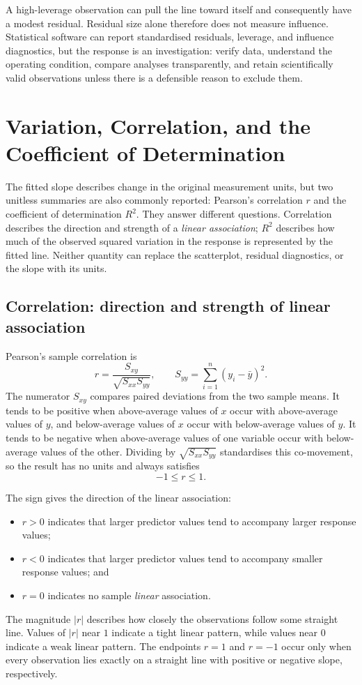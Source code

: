 A high-leverage observation can pull the line toward itself and consequently have a modest residual. Residual size alone therefore does not measure influence. Statistical software can report standardised residuals, leverage, and influence diagnostics, but the response is an investigation: verify data, understand the operating condition, compare analyses transparently, and retain scientifically valid observations unless there is a defensible reason to exclude them.

\section{Variation, Correlation, and the Coefficient of Determination}
\label{sec:regression-r-squared}

The fitted slope describes change in the original measurement units, but two unitless summaries are also commonly reported: Pearson's correlation $r$ and the coefficient of determination $R^2$. They answer different questions. Correlation describes the direction and strength of a \emph{linear association}; $R^2$ describes how much of the observed squared variation in the response is represented by the fitted line. Neither quantity can replace the scatterplot, residual diagnostics, or the slope with its units.

\subsection{Correlation: direction and strength of linear association}

Pearson's sample correlation is
\[
r
=\frac{S_{xy}}{\sqrt{S_{xx}S_{yy}}},
\qquad
S_{yy}=\sum_{i=1}^{n}(y_i-\bar y)^2.
\]
The numerator $S_{xy}$ compares paired deviations from the two sample means. It tends to be positive when above-average values of $x$ occur with above-average values of $y$, and below-average values of $x$ occur with below-average values of $y$. It tends to be negative when above-average values of one variable occur with below-average values of the other. Dividing by $\sqrt{S_{xx}S_{yy}}$ standardises this co-movement, so the result has no units and always satisfies
\[
-1\leq r\leq 1.
\]

The sign gives the direction of the linear association:
\begin{itemize}
    \item $r>0$ indicates that larger predictor values tend to accompany larger response values;
    \item $r<0$ indicates that larger predictor values tend to accompany smaller response values; and
    \item $r=0$ indicates no sample \emph{linear} association.
\end{itemize}
The magnitude $|r|$ describes how closely the observations follow some straight line. Values of $|r|$ near $1$ indicate a tight linear pattern, while values near $0$ indicate a weak linear pattern. The endpoints $r=1$ and $r=-1$ occur only when every observation lies exactly on a straight line with positive or negative slope, respectively.

